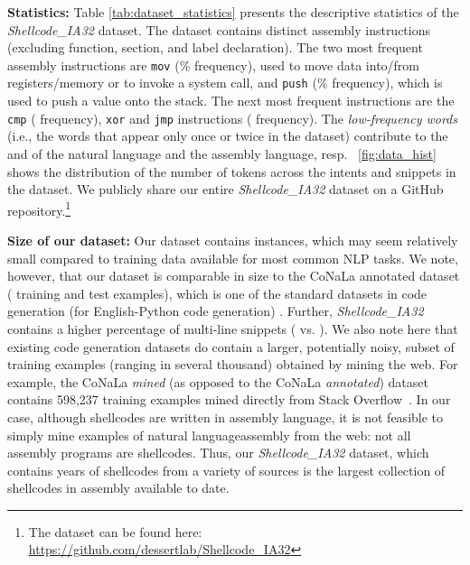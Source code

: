 \documentclass[11pt,a4paper]{article}
\newcommand{\datasetname}[1]{\emph{Shellcode\_IA32}}
\begin{document}
\noindent
\textbf{Statistics:} Table \ref{tab:dataset_statistics} presents the descriptive statistics of the \datasetname{} dataset.
The dataset contains  distinct assembly instructions (excluding function, section, and label declaration).  
The two most frequent assembly instructions are \texttt{mov} (\% frequency), used to move data into/from registers/memory or to invoke a system call, and \texttt{push} (\% frequency), which is used to push a value onto the stack. The next most frequent instructions are the \texttt{cmp} ( frequency), \texttt{xor} and \texttt{jmp} instructions ( frequency). 
The \textit{low-frequency words} (i.e., the words that appear only once or twice in the dataset) contribute to the  and  of the natural language and the assembly language, resp. 
\figurename{}~\ref{fig:data_hist} shows the distribution of the number of tokens across the intents and snippets in the dataset.
We publicly share our entire \datasetname{} dataset on a GitHub repository.\footnote{The dataset can be found here: \url{https://github.com/dessertlab/Shellcode_IA32}}

\noindent
\textbf{Size of our dataset:} Our dataset contains  instances, which may seem relatively small compared to training data available for most common NLP tasks. We note, however, that our dataset is comparable in size to the CoNaLa annotated dataset ( training and  test examples), which is one of the standard datasets in code generation  (for English-Python code generation) \cite{yin2018mining}. Further, \datasetname{} contains a higher percentage of multi-line snippets ( vs. ). We also note here that existing code generation datasets do contain a larger, potentially noisy, subset of training examples (ranging in several thousand) obtained by mining the web. For example, the CoNaLa \textit{mined} (as opposed to the CoNaLa \textit{annotated}) dataset contains 598,237 training examples mined directly from  Stack Overflow~\cite{yin2018mining}. In our case, although shellcodes are written in assembly language, it is not feasible to simply mine examples of natural language\textendash assembly from the web: not all assembly programs are shellcodes.
Thus, our \datasetname{} dataset, which contains  years of shellcodes from a variety of sources is the largest collection of shellcodes in assembly available to date.  
\end{document}
